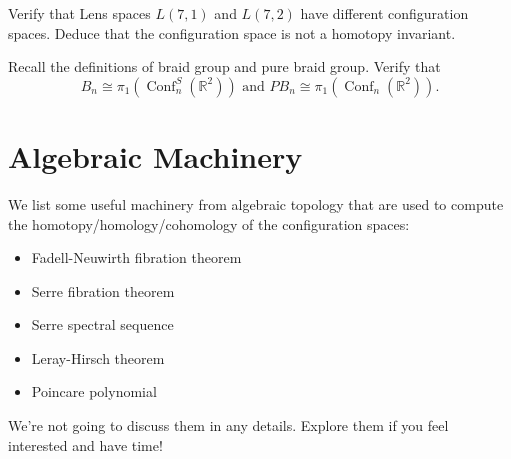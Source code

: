\documentclass{article}
\DeclareMathOperator{\Conf}{Conf}
\begin{document}
\begin{exercise}
Verify that Lens spaces $L(7, 1)$ and $L(7, 2)$ have different configuration spaces. Deduce that the configuration space is not a homotopy invariant. 
\end{exercise}

\begin{exercise} 
Recall the definitions of braid group and pure braid group. Verify that 
\[
B_{n} \cong \pi_{1}(\Conf^{S}_{n}(\mathbb{R}^{2})) \text{ and } PB_{n} \cong \pi_{1}(\Conf_{n}(\mathbb{R}^{2})). 
\]
\end{exercise}

\section{Algebraic Machinery}
We list some useful machinery from algebraic topology that are used to compute the homotopy/homology/cohomology of the configuration spaces: 
\begin{itemize}
    \item Fadell-Neuwirth fibration theorem
    \item Serre fibration theorem 
    \item Serre spectral sequence 
    \item Leray-Hirsch theorem
    \item Poincare polynomial 
\end{itemize}
We're not going to discuss them in any details. Explore them if you feel interested and have time! 
\end{document}
